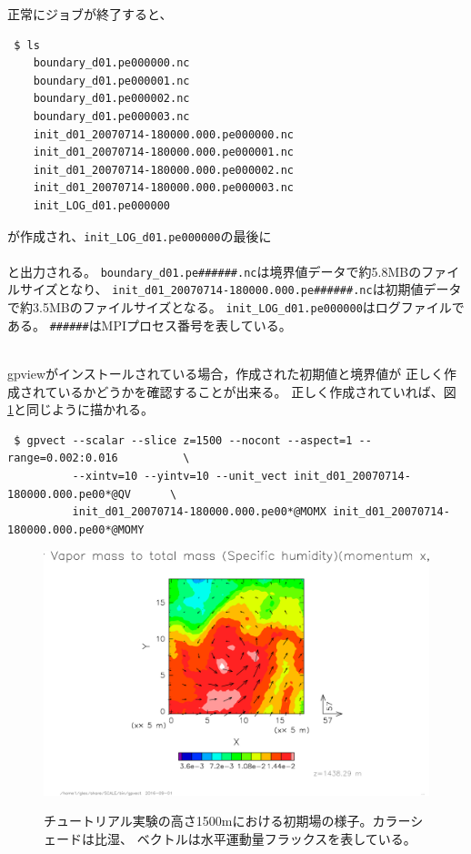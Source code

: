 正常にジョブが終了すると、
\begin{verbatim}
 $ ls
    boundary_d01.pe000000.nc
    boundary_d01.pe000001.nc
    boundary_d01.pe000002.nc
    boundary_d01.pe000003.nc
    init_d01_20070714-180000.000.pe000000.nc
    init_d01_20070714-180000.000.pe000001.nc
    init_d01_20070714-180000.000.pe000002.nc
    init_d01_20070714-180000.000.pe000003.nc
    init_LOG_d01.pe000000
\end{verbatim}
が作成され、\verb|init_LOG_d01.pe000000|の最後に\\

\\

\noindent
と出力される。
\verb|boundary_d01.pe######.nc|は境界値データで約5.8MBのファイルサイズとなり、
\verb|init_d01_20070714-180000.000.pe######.nc|は初期値データで約3.5MBのファイルサイズとなる。
\verb|init_LOG_d01.pe000000|はログファイルである。
\verb|######|はMPIプロセス番号を表している。


\vspace{1cm}
 \hrulefill \\
gpviewがインストールされている場合，作成された初期値と境界値が
正しく作成されているかどうかを確認することが出来る。
正しく作成されていれば、図 \ref{fig:init}と同じように描かれる。

\begin{verbatim}
 $ gpvect --scalar --slice z=1500 --nocont --aspect=1 --range=0.002:0.016          \
          --xintv=10 --yintv=10 --unit_vect init_d01_20070714-180000.000.pe00*@QV      \
          init_d01_20070714-180000.000.pe00*@MOMX init_d01_20070714-180000.000.pe00*@MOMY
\end{verbatim}


\begin{figure}[h]
\begin{center}
  \includegraphics[width=0.9\hsize]{./figure/real_init_qv-momxy.eps}\\
  \caption{チュートリアル実験の高さ1500mにおける初期場の様子。カラーシェードは比湿、
           ベクトルは水平運動量フラックスを表している。}
  \label{fig:init}
\end{center}
\end{figure}

